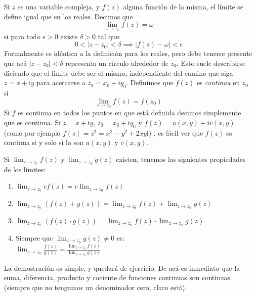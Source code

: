   Si \(z\) es una variable compleja,
  y \(f(z)\) alguna función de la misma,
  el límite se define igual que en los reales.%
  Decimos que
  \begin{equation*}
    \lim_{z \rightarrow z_0} f(z) = \omega
  \end{equation*}
  si para todo \(\epsilon > 0\) existe \(\delta > 0\) tal que:
  \begin{equation}
    \label{eq:complex-limit}
    0 < \lvert z - z_0 \rvert < \delta
      \implies \lvert f(z) - \omega \rvert < \epsilon
  \end{equation}
  Formalmente es idéntica a la definición para los reales,
  pero debe tenerse presente
  que acá \(\lvert z - z_0 \rvert < \delta\)
  representa un círculo alrededor de \(z_0\).
  Esto suele describirse diciendo que el límite debe ser el mismo,
  independiente del camino que siga \(z = x + \mathrm{i} y\)
  para acercarse a \(z_0 = x_0 + \mathrm{i} y_0\).
  Definimos que \(f(z)\) es \emph{continua} en \(z_0\) si
  \begin{equation*}
    \lim_{z \rightarrow z_0} f(z)
      = f(z_0)
  \end{equation*}
  Si \(f\) es continua en todos los puntos en que está definida
  decimos simplemente que es continua.
  Si \(z = x + \mathrm{i} y\),
  \(z_0 = x_0 + \mathrm{i} y_0\)
  y \(f(z) = u(x, y) + \mathrm{i} v(x, y)\)
  (como por ejemplo \(f(z) = z^2 = x^2 - y^2 + 2 x y \mathrm{i}\)) ,
  es fácil ver que \(f(z)\) es continua si y solo si
  lo son \(u(x, y)\) y \(v(x, y)\).
  \begin{lemma}
    \label{lem:complex-limits}
    Si \(\lim_{z \rightarrow z_0} f(z)\)
    y \(\lim_{z \rightarrow z_0} g(z)\)
    existen,
    tenemos las siguientes propiedades de los límites:
    \begin{enumerate}[label=(\roman*), ref=(\roman*)]
    \item
      \(\displaystyle \lim_{z \rightarrow z_0} c f(z)
	= c \lim_{z \rightarrow z_0} f(z)\)
    \item
      \(\displaystyle \lim_{z \rightarrow z_0} (f(z) + g(z))
	= \lim_{z \rightarrow z_0} f(z)
	    + \lim_{z \rightarrow z_0} g(z)\)
    \item
      \(\displaystyle \lim_{z \rightarrow z_0} (f(z) \cdot g(z))
	= \lim_{z \rightarrow z_0} f(z)
	    \cdot \lim_{z \rightarrow z_0} g(z)\)
    \item
      Siempre que \(\lim_{z \rightarrow z_0} g(z) \ne 0\)
      es:\\[0.3ex]
      \(\displaystyle \lim_{z \rightarrow z_0} \frac{f(z)}{g(z)}
	= \frac{\lim_{z \rightarrow z_0} f(z)}
	       {\lim_{z \rightarrow z_0} g(z)}\)
    \end{enumerate}
  \end{lemma}
  La demostración es simple,
  y quedará de ejercicio.
  De acá es inmediato que la suma, diferencia, producto y cociente
  de funciones continuas son continuas
  (siempre que no tengamos un denominador cero,
   claro está).

